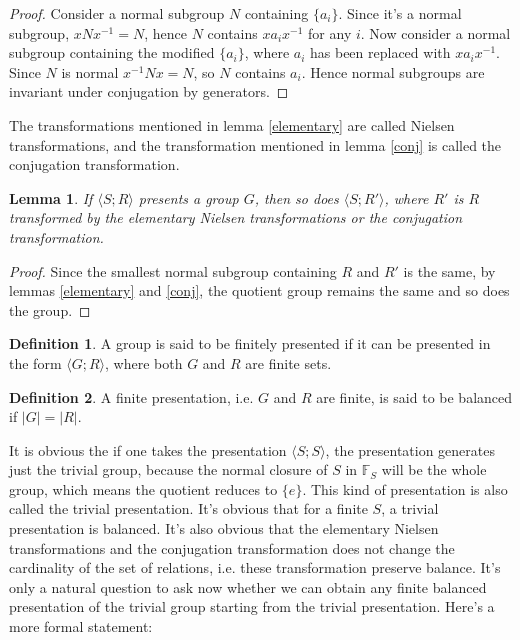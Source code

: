 \documentclass[12pt]{article}
\newtheorem{lem}[thm]{Lemma}
\theoremstyle{definition}
\newtheorem{defn}{Definition}[section]
\begin{document}
\begin{proof}
Consider a normal subgroup $N$ containing $\{a_i\}$. Since it's a normal subgroup, $xNx^{-1}=N$, hence $N$ contains $xa_ix^{-1}$ for any $i$. Now consider a normal subgroup containing the modified $\{a_i\}$, where $a_i$ has been replaced with $xa_ix^{-1}$. Since $N$ is normal $x^{-1}Nx=N$, so $N$ contains $a_i$. Hence normal subgroups are invariant under conjugation by generators.
\end{proof}

The transformations mentioned in lemma \autoref{elementary} are called Nielsen transformations, and the transformation mentioned in lemma \autoref{conj} is called the conjugation transformation.

\begin{lem}
If $\langle S;R \rangle$ presents a group $G$, then so does $\langle S; R' \rangle$, where $R'$ is $R$ transformed by the elementary Nielsen transformations or the conjugation transformation.
\end{lem}

\begin{proof}
Since the smallest normal subgroup containing $R$ and $R'$ is the same, by lemmas \autoref{elementary} and \autoref{conj}, the quotient group remains the same and so does the group.
\end{proof}

\begin{defn}
A group is said to be finitely presented if it can be presented in the form $\langle G;R\rangle$, where both $G$ and $R$ are finite sets.
\end{defn}

\begin{defn}
A finite presentation, i.e. $G$ and $R$ are finite, is said to be balanced if $|G|=|R|$.
\end{defn}

It is obvious the if one takes the presentation $\langle S;S \rangle$, the presentation generates just the trivial group, because the normal closure of $S$ in $\mathbb{F}_S$ will be the whole group, which means the quotient reduces to $\{e\}$. This kind of presentation is also called the trivial presentation. It's obvious that for a finite $S$, a trivial presentation is balanced. It's also obvious that the elementary Nielsen transformations and the conjugation transformation does not change the cardinality of the set of relations, i.e. these transformation preserve balance. It's only a natural question to ask now whether we can obtain any finite balanced presentation of the trivial group starting from the trivial presentation. Here's a more formal statement:
\end{document}
